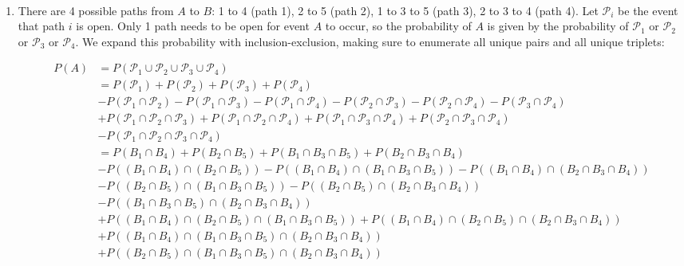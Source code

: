 \begin{problem}{34} $ $

\begin{enumerate}

\item
There are 4 possible paths from $A$ to $B$: 1 to 4 (path 1), 2 to 5 (path 2), 1 to 3 to 5 (path 3), 2 to 3 to 4 (path 4).  Let $\mathcal P_i$ be the event that path $i$ is open.  Only 1 path needs to be open for event $A$ to occur, so the probability of $A$ is given by the probability of $\mathcal P_1$ or $\mathcal P_2$ or $\mathcal P_3$ or $\mathcal P_4$.  We expand this probability with inclusion-exclusion, making sure to enumerate all unique pairs and all unique triplets:

\begin{align*}
P(A)& = P(\mathcal P_1 \cup \mathcal P_2 \cup \mathcal P_3 \cup \mathcal P_4) \\
&= P(\mathcal P_1)+ P(\mathcal P_2)+P(\mathcal P_3)+P( \mathcal P_4) \\
&- P(\mathcal P_1\cap \mathcal P_2)-P(\mathcal P_1\cap \mathcal P_3)-P(\mathcal P_1\cap \mathcal P_4)-P(\mathcal P_2\cap \mathcal P_3)-P(\mathcal P_2\cap \mathcal P_4)-P(\mathcal P_3\cap \mathcal P_4) \\
&+P(\mathcal P_1\cap \mathcal P_2 \cap \mathcal P_3)+P(\mathcal P_1\cap \mathcal P_2 \cap \mathcal P_4)+P(\mathcal P_1\cap \mathcal P_3 \cap \mathcal P_4)+P(\mathcal P_2\cap \mathcal P_3 \cap \mathcal P_4) \\
& - P(\mathcal P_1 \cap \mathcal P_2 \cap \mathcal P_3 \cap \mathcal P_4 ) \\
&= P(B_1\cap B_4)+ P(B_2\cap B_5)+P(B_1 \cap B_3 \cap B_5)+P(B_2 \cap B_3 \cap B_4) \\
&- P((B_1\cap B_4)\cap (B_2\cap B_5))-P((B_1\cap B_4)\cap (B_1 \cap B_3 \cap B_5))-P((B_1\cap B_4)\cap (B_2 \cap B_3 \cap B_4))\\
&-P((B_2\cap B_5)\cap (B_1 \cap B_3 \cap B_5))-P((B_2\cap B_5)\cap (B_2 \cap B_3 \cap B_4))\\
&-P((B_1 \cap B_3 \cap B_5)\cap (B_2 \cap B_3 \cap B_4)) \\
&+P((B_1\cap B_4)\cap (B_2\cap B_5) \cap (B_1 \cap B_3 \cap B_5))+P((B_1\cap B_4)\cap (B_2\cap B_5) \cap (B_2 \cap B_3 \cap B_4))\\
&+P((B_1\cap B_4)\cap (B_1 \cap B_3 \cap B_5) \cap (B_2 \cap B_3 \cap B_4))\\
&+P((B_2\cap B_5)\cap (B_1 \cap B_3 \cap B_5) \cap (B_2 \cap B_3 \cap B_4)) \\

\end{align*}
\end{enumerate}
\end{problem}
